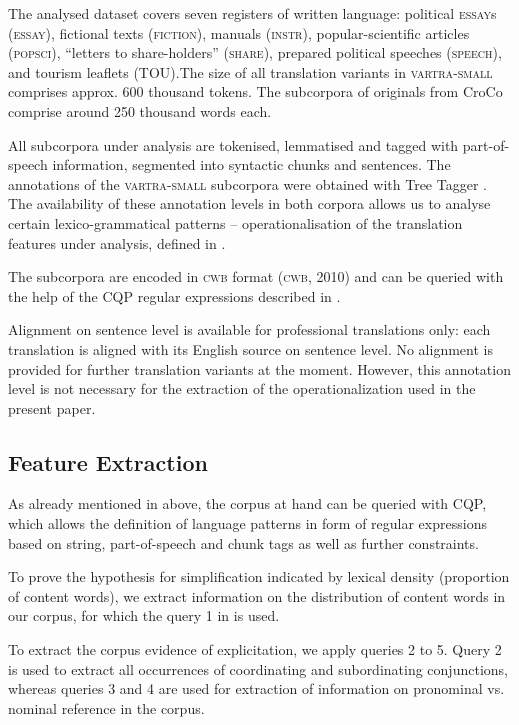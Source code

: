 \documentclass[output=paper]{LSP/langsci}
\begin{document}
The analysed dataset covers seven registers of written language: political \textsc{essay}s (\textsc{essay}), fictional texts (\textsc{fiction}), manuals (\textsc{instr}), popular-scientific articles (\textsc{popsci}), “letters to share-holders” (\textsc{share}), prepared political speeches (\textsc{speech}), and tourism leaflets (TOU).The size of all translation variants in \textsc{vartra}-\textsc{small} comprises approx. 600 thousand tokens.  The subcorpora of originals from CroCo comprise around 250 thousand words each.

All subcorpora under analysis are tokenised, lemmatised and tagged with part-of-speech information, segmented into syntactic chunks and sentences.  The annotations of the \textsc{vartra}-\textsc{small} subcorpora were obtained with Tree Tagger \citep{Schmid1994}. The availability of these annotation levels in both corpora allows us to analyse certain lexico-grammatical patterns – operationalisation of the translation features under analysis, defined in .

The subcorpora are encoded in \textsc{cwb} format (\textsc{cwb}, 2010) and can be queried with the help of the CQP regular expressions described in \citep{Evert2005}.

Alignment on sentence level is available for professional translations only: each translation is aligned with its English source on sentence level.  No alignment is provided for further translation variants at the moment. However, this annotation level is not necessary for the extraction of the operationalization used in the present paper.

\subsection{Feature Extraction}
As already mentioned in  above, the corpus at hand can be queried with CQP, which allows the definition of language patterns in form of regular expressions based on string, part-of-speech and chunk tags as well as further constraints.

To prove the hypothesis for simplification indicated by lexical density (proportion of content words), we extract information on the distribution of content words in our corpus, for which the query 1 in  is used.

To extract the corpus evidence of explicitation, we apply queries 2 to 5. Query 2 is used to extract all occurrences of coordinating and subordinating conjunctions, whereas queries 3 and 4 are used for extraction of information on pronominal vs. nominal reference in the corpus. 
\end{document}
